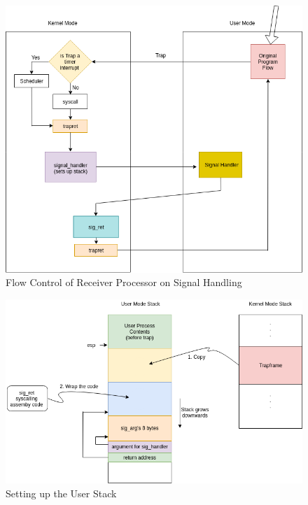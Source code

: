 \documentclass[a4 paper]{article}
\begin{document}
\begin{itemize}
    \begin{figure}[ht!]
      \centering %
      \includegraphics[width=120mm]{./Diagrams/flow_control.png}
      \caption{Flow Control of Receiver Processor on Signal Handling\label{MI1MD}}
    \end{figure}


    \begin{figure}[ht!]
      \centering %
      \includegraphics[width=130mm]{./Diagrams/stack_diagram.png}
      \caption{Setting up the User Stack\label{MIMD}}
    \end{figure}

  \newpage


\end{itemize}
\end{document}
